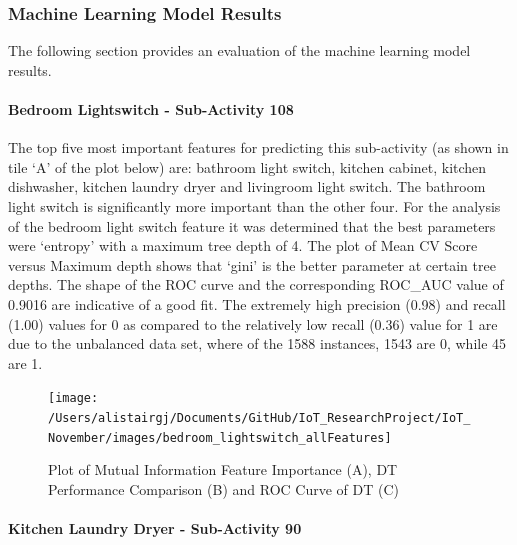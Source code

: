 \documentclass[11pt,]{article}
\let\oldparagraph\paragraph
\renewcommand{\paragraph}[1]{\oldparagraph{#1}\mbox{}}
\begin{document}
\hypertarget{machine-learning-model-results}{%
\subsubsection{Machine Learning Model
Results}\label{machine-learning-model-results}}

The following section provides an evaluation of the machine learning
model results.

\hypertarget{bedroom-lightswitch---sub-activity-108-1}{%
\paragraph{Bedroom Lightswitch - Sub-Activity
108}\label{bedroom-lightswitch---sub-activity-108-1}}

The top five most important features for predicting this sub-activity
(as shown in tile `A' of the plot below) are: bathroom light switch,
kitchen cabinet, kitchen dishwasher, kitchen laundry dryer and
livingroom light switch. The bathroom light switch is significantly more
important than the other four. For the analysis of the bedroom light
switch feature it was determined that the best parameters were `entropy'
with a maximum tree depth of 4. The plot of Mean CV Score versus Maximum
depth shows that `gini' is the better parameter at certain tree depths.
The shape of the ROC curve and the corresponding ROC\_AUC value of
0.9016 are indicative of a good fit. The extremely high precision (0.98)
and recall (1.00) values for 0 as compared to the relatively low recall
(0.36) value for 1 are due to the unbalanced data set, where of the 1588
instances, 1543 are 0, while 45 are 1.

\begin{figure}[H]

{\centering \texttt{[image: /Users/alistairgj/Documents/GitHub/IoT\_ResearchProject/IoT\_November/images/bedroom\_lightswitch\_allFeatures]} 

}

\caption{Plot of Mutual Information Feature Importance (A), DT Performance Comparison (B) and ROC Curve of DT (C)}\label{fig:unnamed-chunk-7}
\end{figure}

\hypertarget{kitchen-laundry-dryer---sub-activity-90-1}{%
\paragraph{Kitchen Laundry Dryer - Sub-Activity
90}\label{kitchen-laundry-dryer---sub-activity-90-1}}
\end{document}
